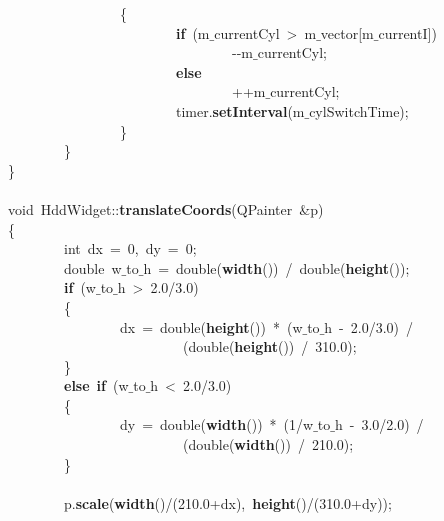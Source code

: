 \mbox{}\ \ \ \ \ \ \ \ \ \ \ \ \ \ \ \ \{ \\
\mbox{}\ \ \ \ \ \ \ \ \ \ \ \ \ \ \ \ \ \ \ \ \ \ \ \ \textbf{if}\ (m$\_$currentCyl\ \textgreater{}\ m$\_$vector[m$\_$currentI]) \\
\mbox{}\ \ \ \ \ \ \ \ \ \ \ \ \ \ \ \ \ \ \ \ \ \ \ \ \ \ \ \ \ \ \ \ -\/-m$\_$currentCyl; \\
\mbox{}\ \ \ \ \ \ \ \ \ \ \ \ \ \ \ \ \ \ \ \ \ \ \ \ \textbf{else} \\
\mbox{}\ \ \ \ \ \ \ \ \ \ \ \ \ \ \ \ \ \ \ \ \ \ \ \ \ \ \ \ \ \ \ \ ++m$\_$currentCyl; \\
\mbox{}\ \ \ \ \ \ \ \ \ \ \ \ \ \ \ \ \ \ \ \ \ \ \ \ timer.\textbf{setInterval}(m$\_$cylSwitchTime); \\
\mbox{}\ \ \ \ \ \ \ \ \ \ \ \ \ \ \ \ \} \\
\mbox{}\ \ \ \ \ \ \ \ \} \\
\mbox{}\} \\
\mbox{} \\
\mbox{}void\ HddWidget::\textbf{translateCoords}(QPainter\ \&p) \\
\mbox{}\{ \\
\mbox{}\ \ \ \ \ \ \ \ int\ dx\ =\ 0,\ dy\ =\ 0; \\
\mbox{}\ \ \ \ \ \ \ \ double\ w$\_$to$\_$h\ =\ double(\textbf{width}())\ /\ double(\textbf{height}()); \\
\mbox{}\ \ \ \ \ \ \ \ \textbf{if}\ (w$\_$to$\_$h\ \textgreater{}\ 2.0/3.0) \\
\mbox{}\ \ \ \ \ \ \ \ \{ \\
\mbox{}\ \ \ \ \ \ \ \ \ \ \ \ \ \ \ \ dx\ =\ double(\textbf{height}())\ *\ (w$\_$to$\_$h\ -\ 2.0/3.0)\ / \\
\mbox{}\ \ \ \ \ \ \ \ \ \ \ \ \ \ \ \ \ \ \ \ \ \ \ \ \ (double(\textbf{height}())\ /\ 310.0); \\
\mbox{}\ \ \ \ \ \ \ \ \} \\
\mbox{}\ \ \ \ \ \ \ \ \textbf{else}\ \textbf{if}\ (w$\_$to$\_$h\ \textless{}\ 2.0/3.0) \\
\mbox{}\ \ \ \ \ \ \ \ \{ \\
\mbox{}\ \ \ \ \ \ \ \ \ \ \ \ \ \ \ \ dy\ =\ double(\textbf{width}())\ *\ (1/w$\_$to$\_$h\ -\ 3.0/2.0)\ / \\
\mbox{}\ \ \ \ \ \ \ \ \ \ \ \ \ \ \ \ \ \ \ \ \ \ \ \ \ (double(\textbf{width}())\ /\ 210.0); \\
\mbox{}\ \ \ \ \ \ \ \ \} \\
\mbox{} \\
\mbox{}\ \ \ \ \ \ \ \ p.\textbf{scale}(\textbf{width}()/(210.0+dx),\ \textbf{height}()/(310.0+dy)); \\

